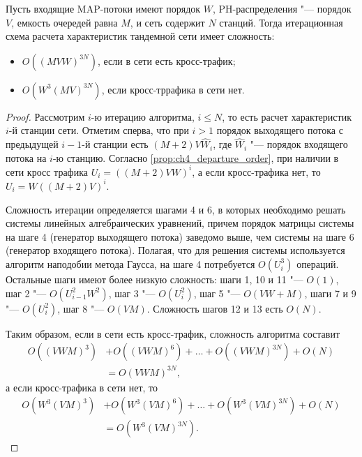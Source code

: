 \begin{prop}\label{prop:ch4_base_algorithm_complexity}
  Пусть входящие MAP-потоки имеют порядок $W$, PH-распределения "--- порядок $V$, емкость очередей равна $M$, и сеть содержит $N$ станций. Тогда итерационная схема расчета характеристик тандемной сети имеет сложность:
  \begin{itemize}
	  \item $O((M V W)^{3N})$, если в сети есть кросс-трафик;
	  \item $O(W^3 (M V)^{3N})$, если кросс-тррафика в сети нет.
  \end{itemize}
\end{prop}
\begin{proof}
Рассмотрим $i$-ю итерацию алгоритма, $i \leqslant N$, то есть расчет характеристик $i$-й станции сети. Отметим сперва, что при $i > 1$ порядок выходящего потока с предыдущей $i-1$-й станции есть $(M + 2) V \hat{W}_i$, где $\hat{W}_i$ "--- порядок входящего потока на $i$-ю станцию. Согласно \ref{prop:ch4_departure_order}, при наличии в сети кросс трафика $U_i = ((M+2)VW)^i$, а если кросс-трафика нет, то $U_i = W((M+2)V)^i$.

Сложность итерации определяется шагами 4 и 6, в которых необходимо решать системы линейных алгебраических уравнений, причем порядок матрицы системы на шаге 4 (генератор выходящего потока) заведомо выше, чем системы на шаге 6 (генератор входящего потока). Полагая, что для решения системы используется алгоритм наподобии метода Гаусса, на шаге 4 потребуется $O(U_i^3)$ операций. Остальные шаги имеют более низкую сложность: шаги 1, 10 и 11 "--- $O(1)$, шаг 2 "--- $O(U_{i-1}^2 W^2)$, шаг 3 "--- $O(U_i^2)$, шаг 5 "--- $O(VW + M)$, шаги 7 и 9 "--- $O(U_i^2)$, шаг 8 "--- $O(VM)$. Сложность шагов 12 и 13 есть $O(N)$.

Таким образом, если в сети есть кросс-трафик, сложность алгоритма составит
$$
  \begin{aligned}
    O((VWM)^3) &+ O((VWM)^6) + \dots + O((VWM)^{3N}) + O(N) \\
    &= O(VWM)^{3N},
  \end{aligned}
$$
а если кросс-трафика в сети нет, то
$$
  \begin{aligned}
    O(W^3 (VM)^3) &+ O(W^3 (VM)^6) + \dots + O(W^3 (VM)^{3N}) + O(N) \\
    &= O(W^3 (VM)^{3N}).
  \end{aligned}
$$

\end{proof}

